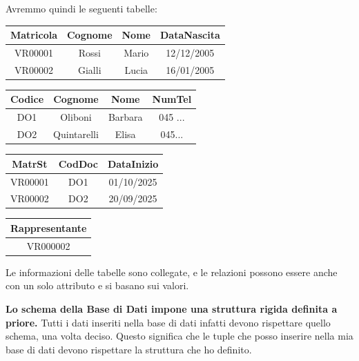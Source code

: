 \documentclass{article}
\begin{document}
\begin{itemize}
    Avremmo quindi le seguenti tabelle:
    
\noindent
\begin{minipage}{.4\textwidth}
  \centering
    \begin{tabular}{|c|c|c|c|}
        \hline
        \textbf{Matricola} & \textbf{Cognome} & \textbf{Nome} & \textbf{DataNascita}\\
        \hline
         VR00001 & Rossi & Mario & 12/12/2005 \\
         \hline
         VR00002 & Gialli & Lucia & 16/01/2005 \\
         \hline
        \end{tabular}
\end{minipage}%
\hfill
\begin{minipage}{.4\textwidth}
  \centering
       \begin{tabular}{|c|c|c|c|}
        \hline
          \textbf{Codice} & \textbf{Cognome} & \textbf{Nome} & \textbf{NumTel} \\
          \hline
          DO1 & Oliboni & Barbara & 045 ... \\
          \hline
          DO2 & Quintarelli & Elisa & 045... \\
          \hline
        \end{tabular}
\hspace{1em}
\end{minipage}

\noindent
\begin{minipage}{.4\textwidth}
  \centering
    \begin{tabular}{|c|c|c|}
        \hline
         \textbf{MatrSt} & \textbf{CodDoc} & \textbf{DataInizio} \\
         \hline
         VR00001 & DO1 & 01/10/2025 \\
         \hline
         VR00002 & DO2 & 20/09/2025\\
         \hline
        \end{tabular}
\end{minipage}%
\hfill
\begin{minipage}{.4\textwidth}
  \centering
       \begin{tabular}{|c|}
        \hline
          \textbf{Rappresentante} \\
          \hline
            VR000002 \\
          \hline
        \end{tabular}
\end{minipage}

    Le informazioni delle tabelle sono collegate, e le relazioni possono essere anche con un solo attributo e si basano sui valori.

    \textbf{Lo schema della Base di Dati impone una struttura rigida definita a priore.} Tutti i dati inseriti nella base di dati infatti devono rispettare quello schema, una volta deciso. Questo significa che le tuple che posso inserire nella mia base di dati devono rispettare la struttura che ho definito. 
    \end{itemize}
\end{document}
